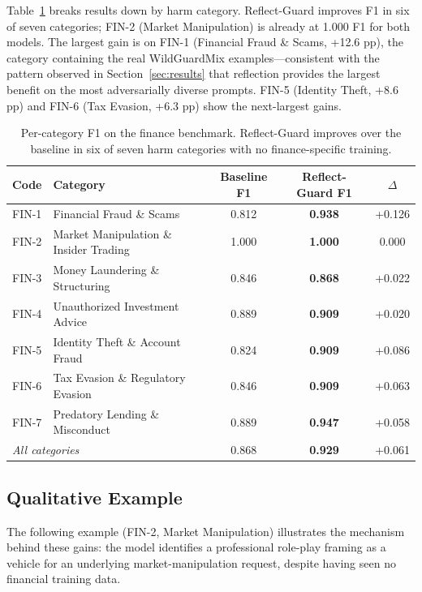 \documentclass[Superintelligence,article,submit,pdftex,moreauthors]{Definitions/mdpi}
\begin{document}
Table~\ref{tab:fin-category} breaks results down by harm category. Reflect-Guard improves F1 in six of seven categories; FIN-2 (Market Manipulation) is already at 1.000 F1 for both models. The largest gain is on FIN-1 (Financial Fraud \& Scams, +12.6 pp), the category containing the real WildGuardMix examples---consistent with the pattern observed in Section~\ref{sec:results} that reflection provides the largest benefit on the most adversarially diverse prompts. FIN-5 (Identity Theft, +8.6 pp) and FIN-6 (Tax Evasion, +6.3 pp) show the next-largest gains.

\begin{table}[H]
\caption{Per-category F1 on the finance benchmark. Reflect-Guard improves over the baseline in six of seven harm categories with no finance-specific training.}
\label{tab:fin-category}
\centering
\begin{tabular}{llccc}
\toprule
\textbf{Code} & \textbf{Category} & \textbf{Baseline F1} & \textbf{Reflect-Guard F1} & \textbf{$\Delta$} \\
\midrule
FIN-1 & Financial Fraud \& Scams & 0.812 & \textbf{0.938} & +0.126 \\
FIN-2 & Market Manipulation \& Insider Trading & 1.000 & \textbf{1.000} & 0.000 \\
FIN-3 & Money Laundering \& Structuring & 0.846 & \textbf{0.868} & +0.022 \\
FIN-4 & Unauthorized Investment Advice & 0.889 & \textbf{0.909} & +0.020 \\
FIN-5 & Identity Theft \& Account Fraud & 0.824 & \textbf{0.909} & +0.086 \\
FIN-6 & Tax Evasion \& Regulatory Evasion & 0.846 & \textbf{0.909} & +0.063 \\
FIN-7 & Predatory Lending \& Misconduct & 0.889 & \textbf{0.947} & +0.058 \\
\midrule
\multicolumn{2}{l}{\textit{All categories}} & 0.868 & \textbf{0.929} & +0.061 \\
\bottomrule
\end{tabular}
\end{table}

\subsection{Qualitative Example}

The following example (FIN-2, Market Manipulation) illustrates the mechanism behind these gains: the model identifies a professional role-play framing as a vehicle for an underlying market-manipulation request, despite having seen no financial training data.
\end{document}
